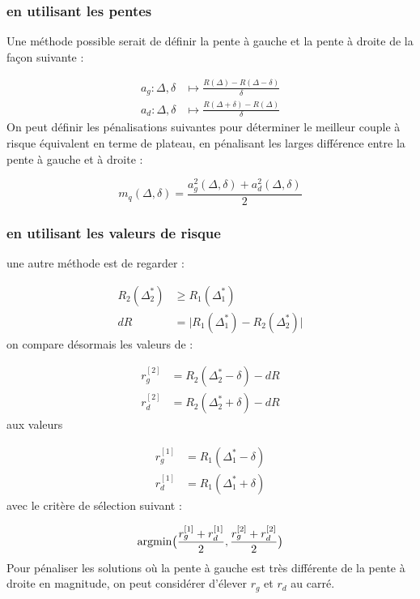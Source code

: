 \subsubsection{en utilisant les pentes}


Une méthode possible serait de définir la pente à gauche et la pente à droite de la façon suivante :

\begin{align*}
	a_g : \Delta, \delta & \mapsto \frac{R(\Delta) - R(\Delta - \delta)}{\delta} \\
	a_d : \Delta, \delta & \mapsto \frac{R(\Delta + \delta) - R(\Delta)}{\delta}
\end{align*}
On peut définir les pénalisations suivantes pour déterminer le meilleur couple à risque équivalent en terme de plateau, en pénalisant les larges différence entre la pente à gauche et à droite :

\begin{equation*}
	m_q(\Delta, \delta) = \frac{a_g^2(\Delta, \delta) + a_d^2(\Delta, \delta)}{2}
\end{equation*}

\subsubsection{en utilisant les valeurs de risque}
une autre méthode est de regarder :

\begin{align*}
	R_2(\Delta^*_2) & \geq R_1(\Delta^*_1)                                      \\
	dR              & = \bigl\vert R_1(\Delta^*_1) - R_2(\Delta^*_2) \bigr\vert
\end{align*}
on compare désormais les valeurs de :

\begin{align*}
	r_g^{[2]} & = R_2(\Delta^*_2 - \delta) - dR \\
	r_d^{[2]} & = R_2(\Delta^*_2 + \delta) - dR
\end{align*}
aux valeurs

\begin{align*}
	r_g^{[1]} & = R_1(\Delta^*_1 - \delta) \\
	r_d^{[1]} & = R_1(\Delta^*_1 + \delta)
\end{align*}
avec le critère de sélection suivant :

\begin{equation*}
	\argmin \bigl( \frac{r_g^{[1]} + r_d^{[1]}}{2}, \frac{r_g^{[2]} + r_d^{[2]}}{2}  \bigr)
\end{equation*}
Pour pénaliser les solutions où la pente à gauche est très différente de la pente à droite en magnitude, on peut considérer d'élever $r_g$ et $r_d$ au carré.

